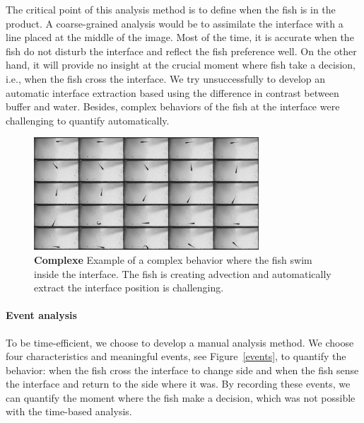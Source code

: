   The critical point of this analysis method is to define when the fish is in the product. A coarse-grained analysis would be to assimilate the interface with a line placed at the middle of the image. Most of the time, it is accurate when the fish do not disturb the interface and reflect the fish preference well. On the other hand, it will provide no insight at the crucial moment where fish take a decision, i.e., when the fish cross the interface. We try unsuccessfully to develop an automatic interface extraction based using the difference in contrast between buffer and water. Besides, complex behaviors of the fish at the interface were challenging to quantify automatically.

    \begin{figure}[h]
      \centering
      \includegraphics[width=0.75\textwidth]{part_2/assets/behavior.jpg}
      \caption{\textbf{Complexe} Example of a complex behavior where the fish swim inside the interface. The fish is creating advection and automatically extract the interface position is challenging.}
      \label{ld_bias}
    \end{figure}

  \paragraph{Event analysis} To be time-efficient, we choose to develop a manual analysis method. We choose four characteristics and meaningful events, see Figure~\ref{events}, to quantify the behavior: when the fish cross the interface to change side and when the fish sense the interface and return to the side where it was. By recording these events, we can quantify the moment where the fish make a decision, which was not possible with the time-based analysis.

